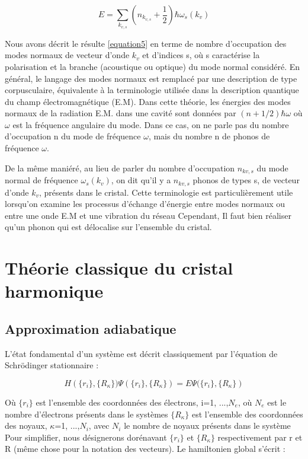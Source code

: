 \documentclass[12pt,a4paper]{book}
\begin{document}
\begin{equation}
E = \sum_{k_{v,s}} \left (n_{k_{v,s}}+\frac{1}{2}\right)\hbar\omega_{s}(k_{v}) \label{equation5}
\end{equation}

Nous avons décrit le résulte \ref{equation5} en terme de nombre d'occupation des modes normaux de vecteur d'onde $k_{v}$ et d'indices s, où s caractérise la polarisation et la branche (acoustique ou optique) du mode normal considéré. En général, le langage des modes normaux est remplacé par une description de type corpusculaire, équivalente à la terminologie utilisée dans la description quantique du champ électromagnétique (E.M). Dans cette théorie, les énergies des modes normaux de la radiation E.M. dans une cavité sont données par $(n+1/2)\hbar\omega$ où $\omega$ est la fréquence angulaire du mode. Dans ce cas, on ne parle pas du nombre d'occupation n du mode de fréquence $\omega$, mais du nombre n de phonos de fréquence $\omega$.

De la même maniéré, au lieu de parler du nombre d'occupation $n_{kv,s}$ du mode normal de fréquence $\omega_{s}(k_{v})$, on dit qu'il y a $n_{kv,s}$ phonos de types s, de vecteur d'onde $k_{v}$, présents dans le cristal. Cette terminologie est particulièrement utile lorsqu'on examine les processus d'échange d'énergie entre modes normaux ou entre une onde E.M et une vibration du réseau Cependant, Il faut bien réaliser qu'un phonon qui est délocalise sur l'ensemble du cristal.

\section{Théorie classique du cristal harmonique}

\subsection{Approximation adiabatique}

L'état fondamental d'un système est décrit classiquement par l'équation de Schr\"{o}dinger stationnaire :

\begin{equation}
H\left(\{r_{i}\},\{R_{\kappa}\})\Psi(\{r_{i}\},\{R_{\kappa}\}) = E\Psi(\{r_{i}\},\{R_{\kappa}\}\right)
\end{equation}

Où $\{r_{i}\}$ est l'ensemble des coordonnées des électrons, i=1, ...,$N_{e}$, où $N_{e}$ est le nombre d'électrons présents dans le systèmes $\{R_{\kappa}\}$ est l'ensemble des coordonnées des noyaux, $\kappa$=1, ...,$N_{i}$, avec $N_{i}$ le nombre de noyaux présents dans le système Pour simplifier, nous désignerons dorénavant $\{r_{i}\}$ et $\{R_{\kappa}\}$ respectivement par r et R (même chose pour la notation des vecteurs). Le hamiltonien global s'écrit :
\end{document}
